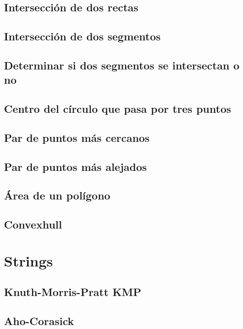 \documentclass[10pt,letterpaper,twocolumn,twosided]{article}
\begin{document}
\subsection{Intersección de dos rectas}

\subsection{Intersección de dos segmentos}

\subsection{Determinar si dos segmentos se intersectan o no}

\subsection{Centro del círculo que pasa por tres puntos}

\subsection{Par de puntos más cercanos}

\subsection{Par de puntos más alejados}

\subsection{Área de un polígono}

\subsection{Convexhull}

\section{Strings}

\subsection{Knuth-Morris-Pratt KMP}

\subsection{Aho-Corasick}
\end{document}
